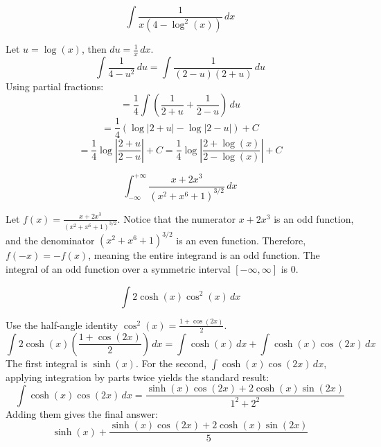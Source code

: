 \begin{questions}
    \question \[\int \frac{1}{x(4 - \log^2(x))} \,dx\]
    \begin{solution}
        Let $u = \log(x)$, then $du = \frac{1}{x} \,dx$.
        \[\int \frac{1}{4 - u^2} \,du = \int \frac{1}{(2-u)(2+u)} \,du\]
        Using partial fractions:
        \[= \frac{1}{4} \int \left( \frac{1}{2+u} + \frac{1}{2-u} \right) \,du\]
        \[= \frac{1}{4} (\log|2+u| - \log|2-u|) + C\]
        \[= \frac{1}{4} \log \left| \frac{2+u}{2-u} \right| + C = \frac{1}{4} \log \left| \frac{2 + \log(x)}{2 - \log(x)} \right| + C\]
    \end{solution}

    \question \[\int_{-\infty}^{+\infty} \frac{x + 2x^3}{(x^2 + x^6 + 1)^{3/2}} \,dx\]
    \begin{solution}
        Let $f(x) = \frac{x + 2x^3}{(x^2 + x^6 + 1)^{3/2}}$.
        Notice that the numerator $x + 2x^3$ is an odd function, and the denominator $(x^2 + x^6 + 1)^{3/2}$ is an even function.
        Therefore, $f(-x) = -f(x)$, meaning the entire integrand is an odd function.
        The integral of an odd function over a symmetric interval $[-\infty, \infty]$ is $0$.
    \end{solution}

    \question \[\int 2\cosh(x)\cos^2(x) \,dx\]
    \begin{solution}
        Use the half-angle identity $\cos^2(x) = \frac{1 + \cos(2x)}{2}$.
        \[\int 2\cosh(x) \left( \frac{1 + \cos(2x)}{2} \right) \,dx = \int \cosh(x) \,dx + \int \cosh(x)\cos(2x) \,dx\]
        The first integral is $\sinh(x)$. 
        For the second, $\int \cosh(x)\cos(2x) \,dx$, applying integration by parts twice yields the standard result:
        \[\int \cosh(x)\cos(2x) \,dx = \frac{\sinh(x)\cos(2x) + 2\cosh(x)\sin(2x)}{1^2 + 2^2}\]
        Adding them gives the final answer:
        \[\sinh(x) + \frac{\sinh(x)\cos(2x) + 2\cosh(x)\sin(2x)}{5}\]
    \end{solution}
\end{questions}

